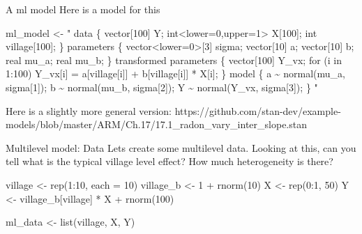 \documentclass[
  11pt,
  ignorenonframetext,
]{beamer}
\newenvironment{Shaded}{\begin{snugshade}}{\end{snugshade}}
\newcommand{\AttributeTok}[1]{\textcolor[rgb]{0.40,0.45,0.13}{#1}}
\newcommand{\DecValTok}[1]{\textcolor[rgb]{0.68,0.00,0.00}{#1}}
\newcommand{\FunctionTok}[1]{\textcolor[rgb]{0.28,0.35,0.67}{#1}}
\newcommand{\NormalTok}[1]{\textcolor[rgb]{0.00,0.23,0.31}{#1}}
\newcommand{\OtherTok}[1]{\textcolor[rgb]{0.00,0.23,0.31}{#1}}
\newcommand{\SpecialCharTok}[1]{\textcolor[rgb]{0.37,0.37,0.37}{#1}}
\newcommand{\StringTok}[1]{\textcolor[rgb]{0.13,0.47,0.30}{#1}}
\begin{document}
\begin{frame}[fragile]{A ml model}
\protect\hypertarget{a-ml-model-1}{}
Here is a model for this

\tiny

\begin{Shaded}
\begin{Highlighting}[]
\NormalTok{ml\_model }\OtherTok{\textless{}{-}} \StringTok{"}
\StringTok{data \{}
\StringTok{  vector[100] Y;}
\StringTok{  int\textless{}lower=0,upper=1\textgreater{} X[100];}
\StringTok{  int village[100];}
\StringTok{\}}
\StringTok{parameters \{}
\StringTok{  vector\textless{}lower=0\textgreater{}[3] sigma; }
\StringTok{  vector[10] a;}
\StringTok{  vector[10] b;}
\StringTok{  real mu\_a;}
\StringTok{  real mu\_b;}
\StringTok{\}}
\StringTok{transformed parameters \{}
\StringTok{  vector[100] Y\_vx;}
\StringTok{  for (i in 1:100) Y\_vx[i] = a[village[i]] + b[village[i]] * X[i];}
\StringTok{\}}
\StringTok{model \{}
\StringTok{  a \textasciitilde{} normal(mu\_a, sigma[1]);}
\StringTok{  b \textasciitilde{} normal(mu\_b, sigma[2]);}
\StringTok{  Y \textasciitilde{} normal(Y\_vx, sigma[3]);}
\StringTok{\}}
\StringTok{"}
\end{Highlighting}
\end{Shaded}

Here is a slightly more general version:
https://github.com/stan-dev/example-models/blob/master/ARM/Ch.17/17.1\_radon\_vary\_inter\_slope.stan
\end{frame}

\begin{frame}[fragile]{Multilevel model: Data}
\protect\hypertarget{multilevel-model-data-1}{}
Lets create some multilevel data. Looking at this, can you tell what is
the typical village level effect? How much heterogeneity is there?

\begin{Shaded}
\begin{Highlighting}[]
\NormalTok{village }\OtherTok{\textless{}{-}} \FunctionTok{rep}\NormalTok{(}\DecValTok{1}\SpecialCharTok{:}\DecValTok{10}\NormalTok{, }\AttributeTok{each =} \DecValTok{10}\NormalTok{)}
\NormalTok{village\_b }\OtherTok{\textless{}{-}} \DecValTok{1} \SpecialCharTok{+} \FunctionTok{rnorm}\NormalTok{(}\DecValTok{10}\NormalTok{)}
\NormalTok{X }\OtherTok{\textless{}{-}} \FunctionTok{rep}\NormalTok{(}\DecValTok{0}\SpecialCharTok{:}\DecValTok{1}\NormalTok{, }\DecValTok{50}\NormalTok{)}
\NormalTok{Y }\OtherTok{\textless{}{-}}\NormalTok{ village\_b[village] }\SpecialCharTok{*}\NormalTok{ X }\SpecialCharTok{+} \FunctionTok{rnorm}\NormalTok{(}\DecValTok{100}\NormalTok{)}

\NormalTok{ml\_data }\OtherTok{\textless{}{-}} \FunctionTok{list}\NormalTok{(village, X, Y)}
\end{Highlighting}
\end{Shaded}
\end{frame}
\end{document}
